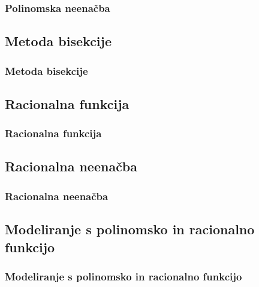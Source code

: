         \begin{frame}
            \frametitle{Polinomska neenačba}
        \end{frame}

    \subsection{Metoda bisekcije}

        \begin{frame}
            \frametitle{Metoda bisekcije}
        \end{frame}

    \subsection{Racionalna funkcija}

        \begin{frame}
            \frametitle{Racionalna funkcija}
        \end{frame}

    \subsection{Racionalna neenačba}

        \begin{frame}
            \frametitle{Racionalna neenačba}
        \end{frame}

    \subsection{Modeliranje s polinomsko in racionalno funkcijo}

        \begin{frame}
            \frametitle{Modeliranje s polinomsko in racionalno funkcijo}
        \end{frame}

